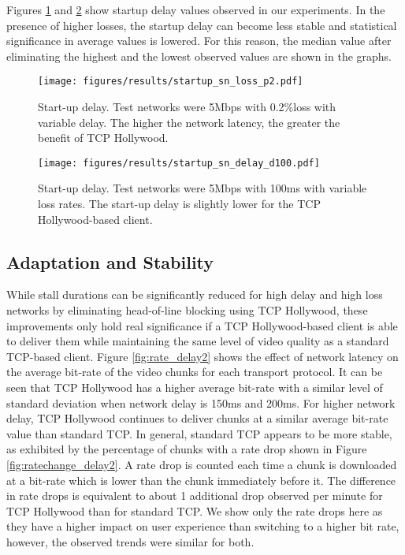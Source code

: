 Figures \ref{fig:startup_delay2} and \ref{fig:startup_loss} show startup delay values
observed in our experiments. In the presence of higher losses, the startup delay can
become less stable and statistical significance in average values is lowered. For this
reason, the median value after eliminating the highest and the lowest observed values are
shown in the graphs.

\begin{figure}
  \centering
  \texttt{[image: figures/results/startup\_sn\_loss\_p2.pdf]}
  \caption{Start-up delay. Test networks were 5Mbps with 0.2\%loss with variable delay. 
           The higher the network latency, the greater the benefit of TCP Hollywood. }
  \label{fig:startup_delay2}
\end{figure}


\begin{figure}
  \centering
  \texttt{[image: figures/results/startup\_sn\_delay\_d100.pdf]}
  \caption{Start-up delay. Test networks were 5Mbps with 100ms with variable loss rates.  
           The start-up delay is slightly lower for the TCP Hollywood-based client.}
  \label{fig:startup_loss}
\end{figure}

\subsection{Adaptation and Stability}
While stall durations can be significantly reduced for high delay and high loss networks
by eliminating head-of-line blocking using TCP Hollywood, these improvements only hold
real significance if a TCP Hollywood-based client is able to deliver them while maintaining
the same level of video quality as a standard TCP-based client. Figure \ref{fig:rate_delay2} 
shows the effect of network latency on the average bit-rate of the video chunks for each transport
protocol. It can be seen that TCP Hollywood has a higher average bit-rate with a similar
level of standard deviation when network delay is 150ms and 200ms. For higher network
delay, TCP Hollywood continues to deliver chunks at a similar average bit-rate value than
standard TCP. In general, standard TCP appears to be more stable, as exhibited by the
percentage of chunks with a rate drop shown in Figure \ref{fig:ratechange_delay2}. A rate
drop is counted each time a chunk is downloaded at a bit-rate which is lower than the chunk
immediately before it. The difference in rate drops is equivalent to about 1 additional
drop observed per minute for TCP Hollywood than for standard TCP. We show only the rate drops here as they have a higher impact on user experience than switching to a higher bit rate, however, the observed trends were similar for both. 

